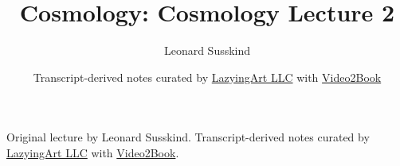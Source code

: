 \documentclass[11pt,oneside]{book}
\begin{document}
\frontmatter
\title{Cosmology: Cosmology Lecture 2}
\author{Leonard Susskind}
\date{Transcript-derived notes curated by \href{https://lazying.art}{LazyingArt LLC} with \href{https://github.com/lachlanchen/Video2Book}{Video2Book}}
\maketitle
\begin{center}
\small Original lecture by Leonard Susskind. Transcript-derived notes curated by \href{https://lazying.art}{LazyingArt LLC} with \href{https://github.com/lachlanchen/Video2Book}{Video2Book}.
\end{center}
\clearpage
\mainmatter

\end{document}
